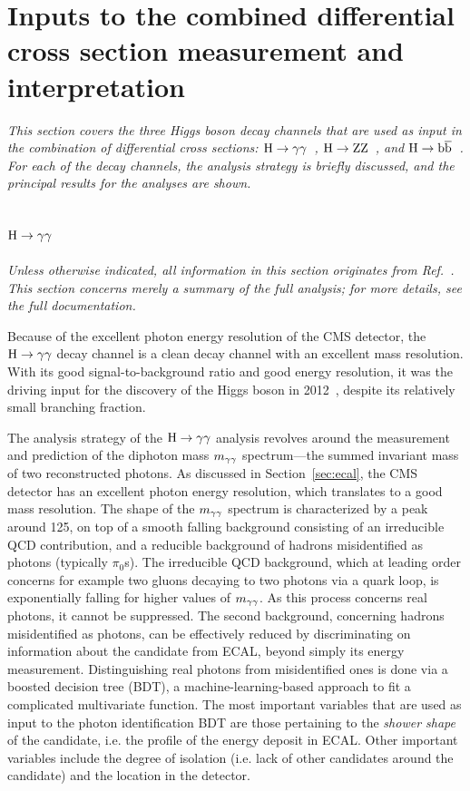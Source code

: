 \section{Inputs to the combined differential cross section measurement and interpretation}
\label{sec:inputs}

\emph{%
This section covers the three Higgs boson decay channels that are used as input in the combination of differential cross sections: $\mathrm{H}\to\mathrm{\gamma}\mathrm{\gamma}$~\cite{Sirunyan:2018kta}, $\mathrm{H}\to\mathrm{Z}\mathrm{Z}$~\cite{Sirunyan:2017exp}, and $\mathrm{H}\to\mathrm{b}\overline{\mathrm{b}}$~\cite{Sirunyan:2017dgc}.
% 
For each of the decay channels, the analysis strategy is briefly discussed, and the principal results for the analyses are shown.
}

\subsection{\texorpdfstring{$\mathrm{H}\to\mathrm{\gamma}\mathrm{\gamma}$}{H to gamma gamma}}

\emph{%
Unless otherwise indicated, all information in this section originates from Ref.~\cite{Sirunyan:2018kta}. This section concerns merely a summary of the full analysis; for more details, see the full documentation.
}

Because of the excellent photon energy resolution of the CMS detector, the $\mathrm{H}\to\mathrm{\gamma}\mathrm{\gamma}$ decay channel is a clean decay channel with an excellent mass resolution.
% 
With its good signal-to-background ratio and good energy resolution, it was the driving input for the discovery of the Higgs boson in 2012~\cite{Aad:2012tfa,Chatrchyan:2012xdj,Chatrchyan:2013lba}, despite its relatively small branching fraction.


The analysis strategy of the $\mathrm{H}\to\mathrm{\gamma}\mathrm{\gamma}$ analysis revolves around the measurement and prediction of the diphoton mass $m_{\mathrm{\gamma}\mathrm{\gamma}}$ spectrum---the summed invariant mass of two reconstructed photons.
% 
As discussed in Section~\ref{sec:ecal}, the CMS detector has an excellent photon energy resolution, which translates to a good mass resolution.
% 
The shape of the $m_{\mathrm{\gamma}\mathrm{\gamma}}$ spectrum is characterized by a peak around 125\GeV, on top of a smooth falling background consisting of an irreducible QCD contribution, and a reducible background of hadrons misidentified as photons (typically $\pi_0$s).
% 
The irreducible QCD background, which at leading order concerns for example two gluons decaying to two photons via a quark loop, is exponentially falling for higher values of $m_{\mathrm{\gamma}\mathrm{\gamma}}$.
% 
As this process concerns real photons, it cannot be suppressed.
% 
The second background, concerning hadrons misidentified as photons, can be effectively reduced by discriminating on information about the candidate from ECAL, beyond simply its energy measurement.
% 
Distinguishing real photons from misidentified ones is done via a boosted decision tree (BDT), a machine-learning-based approach to fit a complicated multivariate function.
% 
The most important variables that are used as input to the photon identification BDT are those pertaining to the \textit{shower shape} of the candidate, i.e. the profile of the energy deposit in ECAL.
% 
Other important variables include the degree of isolation (i.e. lack of other candidates around the candidate) and the location in the detector.


